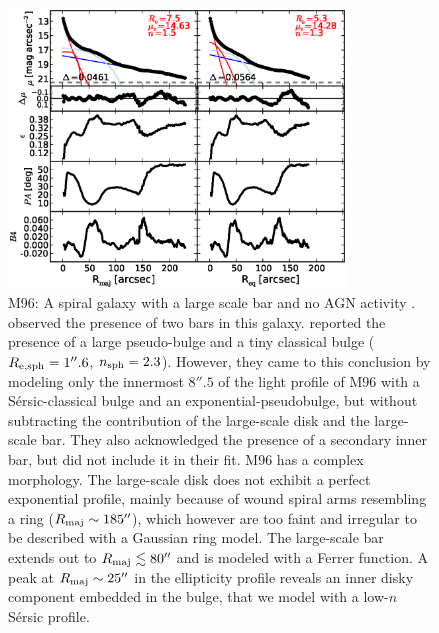 \documentclass[preprint2]{emulateapj}
\newcommand{\fitfigurewidth}{0.8\textwidth}
\begin{document}
  \begin{figure}[h]
  \begin{center}
  \includegraphics[width=\fitfigurewidth]{m96_1Dfit.eps}
  \caption{M96:
  A spiral galaxy with a large scale bar and no AGN activity \citep{martini2003,nowak2010n3368n3489}. 
  \cite{erwin2004} observed the presence of two bars in this galaxy. 
  \cite{nowak2010n3368n3489} reported the presence of a large pseudo-bulge and a tiny classical bulge 
  ($R_{\rm e, sph} = 1''.6$, $n_{\rm sph} = 2.3$). 
  However, they came to this conclusion by modeling only the innermost $8''.5$ of the 
  light profile of M96 with a S\'ersic-classical bulge and an exponential-pseudobulge, 
  but without subtracting the contribution of the large-scale disk and the large-scale bar.
  They also acknowledged the presence of a secondary inner bar, but did not include it in their fit. 
  M96 has a complex morphology. 
  The large-scale disk does not exhibit a perfect exponential profile, 
  mainly because of wound spiral arms resembling a ring ($R_{\rm maj} \sim 185''$),
  which however are too faint and irregular to be described with a Gaussian ring model. 
  The large-scale bar extends out to $R_{\rm maj} \lesssim 80''$ and is modeled with a Ferrer function.
  A peak at $R_{\rm maj} \sim 25''$ in the ellipticity profile reveals an inner disky component embedded in the bulge, 
  that we model with a low-$n$ S\'ersic profile.
  }
  \end{center}
  \end{figure}
\end{document}
